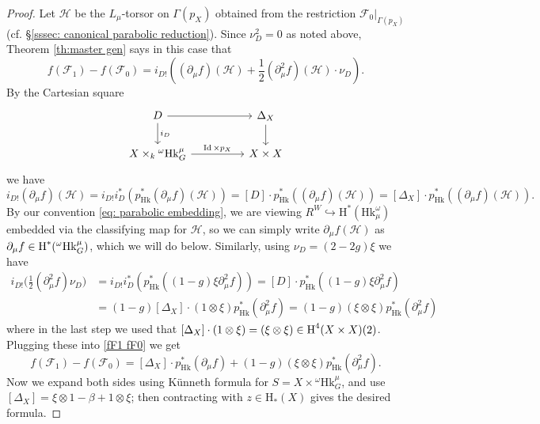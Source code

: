 \documentclass[reqno]{amsart}
\numberwithin{equation}{subsection}
\theoremstyle{definition}
\newcommand\cF{\mathcal{F}}
\newcommand\cH{\mathcal{H}}
\newcommand\Hk{\mathrm{Hk}}
\newcommand\ot{\otimes}
\newcommand{\cohog}[2]{\textup{H}^{#1}({#2})}     %
\renewcommand\b\beta
\newcommand\D\Delta
\newcommand{\om}{\omega}
\newcommand\pl{\partial}
\newcommand{\inj}{\hookrightarrow}
\DeclareMathOperator{\Id}{Id}
\newcommand{\rH}{\ensuremath{\mathrm{H}}\xspace}
\begin{document}
\begin{proof}
Let $\cH$ be the $L_\mu$-torsor on $\Gamma(p_X)$ obtained from the restriction $\cF_0|_{\Gamma(p_X)}$ (cf. \S\ref{sssec: canonical parabolic reduction}). Since $\nu_D^2  =0 $ as noted above, Theorem \ref{th:master gen} says in this case that 
\begin{equation}\label{fF1 fF0}
f(\cF_{1})-f(\cF_{0})=i_{D!}\left((\pl_{\mu}f)(\cH)+\frac{1}{2}(\pl^{2}_{\mu}f)(\cH)\cdot \nu_{D}\right).
\end{equation}
By the Cartesian square
\begin{equation*}
\begin{tikzcd}[column sep = huge]
D \ar[d, "i_D"] \ar[r] & \Delta_X \ar[d] \\
X \times_k {}^{\om} \Hk^{\mu}_G   \ar[r, "\Id \times p_X"] & X \times X
\end{tikzcd}
\end{equation*}
we have 
\begin{equation*}
i_{D!}(\pl_{\mu}f)(\cH)=i_{D!}i_{D}^{*}(p_{\Hk}^{*}(\pl_{\mu}f)(\cH))=[D]\cdot p_{\Hk}^{*}((\pl_{\mu}f)(\cH))=[\D_{X}]\cdot p_{\Hk}^{*}((\pl_{\mu}f)(\cH)).
\end{equation*}
By our convention \eqref{eq: parabolic embedding}, we are viewing $R^W \inj \rH^*(\Hk_\mu^\om)$ embedded via the classifying map for $\cH$, so we can simply write $\pl_{\mu}f(\cH)$ as $\pl_{\mu}f\in \cohog{*}{{}^{\om} \Hk^{\mu}_G}$, which we will do below. Similarly, using $\nu_D = (2-2g) \xi$ we have
\begin{align*}
i_{D!}\Big(\frac{1}{2}(\pl^{2}_{\mu}f)\nu_{D} \Big) & =i_{D!}i_{D}^{*}(p_{\Hk}^{*}((1-g)\xi\pl^{2}_{\mu}f))=[D]\cdot p_{\Hk}^{*}((1-g)\xi\pl^{2}_{\mu}f)\\
&= (1-g)[\D_{X}]\cdot(1\ot\xi) p_{\Hk}^{*}(\pl^{2}_{\mu}f)=(1-g)(\xi\ot\xi)p_{\Hk}^{*}(\pl^{2}_{\mu}f)
\end{align*}
where in the last step we used that $[\Delta_X] \cdot (1 \otimes \xi) = (\xi \otimes \xi ) \in \cohog{4}{X \times X}(2)$. Plugging these into \eqref{fF1 fF0} we get
\begin{equation*}
f(\cF_{1})-f(\cF_{0})=[\D_{X}]\cdot p_{\Hk}^{*}(\pl_{\mu}f)+(1-g)(\xi\ot\xi)p_{\Hk}^{*}(\pl^{2}_{\mu}f).
\end{equation*}
Now we expand both sides using K\"unneth formula for $S=X\times {}^\omega \Hk^{\mu}_G$, and use $[\D_{X}]=\xi\ot 1-\b+1\ot \xi$; then contracting with $z \in \rH_*(X)$ gives the desired formula.
\end{proof}
\end{document}
